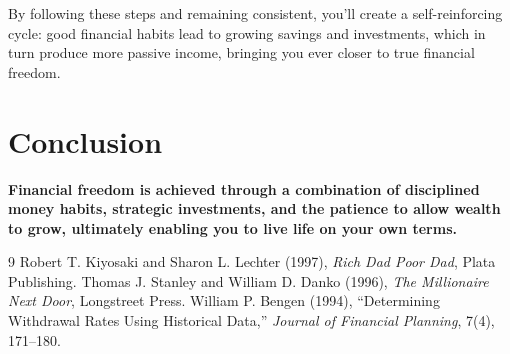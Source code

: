 \documentclass[12pt]{article}
\begin{document}
By following these steps and remaining consistent, you'll create a self-reinforcing cycle: good financial habits lead to growing savings and investments, which in turn produce more passive income, bringing you ever closer to true financial freedom.
\section{Conclusion}
\textbf{Financial freedom is achieved through a combination of disciplined money habits, strategic investments, and the patience to allow wealth to grow, ultimately enabling you to live life on your own terms.}
\begin{thebibliography}{9}
 Robert T. Kiyosaki and Sharon L. Lechter (1997), \textit{Rich Dad Poor Dad}, Plata Publishing.
 Thomas J. Stanley and William D. Danko (1996), \textit{The Millionaire Next Door}, Longstreet Press.
 William P. Bengen (1994), ``Determining Withdrawal Rates Using Historical Data,'' \textit{Journal of Financial Planning}, 7(4), 171--180.
\end{thebibliography}
\end{document}
